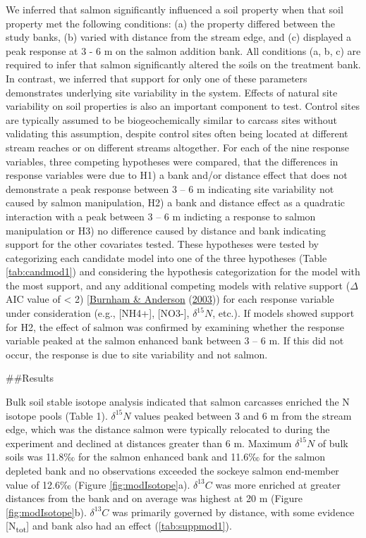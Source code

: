 \documentclass [11pt, proquest] {uwthesis}[2015/03/03]
\begin{document}
We inferred that salmon significantly influenced a soil property when that soil property met the following conditions: (a) the property differed between the study banks, (b) varied with distance from the stream edge, and (c) displayed a peak response at 3 - 6 m on the salmon addition bank. All conditions (a, b, c) are required to infer that salmon significantly altered the soils on the treatment bank. In contrast, we inferred that support for only one of these parameters demonstrates underlying site variability in the system. Effects of natural site variability on soil properties is also an important component to test. Control sites are typically assumed to be biogeochemically similar to carcass sites without validating this assumption, despite control sites often being located at different stream reaches or on different streams altogether. For each of the nine response variables, three competing hypotheses were compared, that the differences in response variables were due to H1) a bank and/or distance effect that does not demonstrate a peak response between 3 -- 6 m indicating site variability not caused by salmon manipulation, H2) a bank and distance effect as a quadratic interaction with a peak between 3 -- 6 m indicting a response to salmon manipulation or H3) no difference caused by distance and bank indicating support for the other covariates tested. These hypotheses were tested by categorizing each candidate model into one of the three hypotheses (Table \ref{tab:candmod1}) and considering the hypothesis categorization for the model with the most support, and any additional competing models with relative support (\(\Delta\)AIC value of \textless{} 2) {[}\protect\hyperlink{ref-Burnham2003}{Burnham \& Anderson} (\protect\hyperlink{ref-Burnham2003}{2003})) for each response variable under consideration (e.g., {[}NH4+{]}, {[}NO3-{]}, \(\delta^{15}N\), etc.). If models showed support for H2, the effect of salmon was confirmed by examining whether the response variable peaked at the salmon enhanced bank between 3 -- 6 m. If this did not occur, the response is due to site variability and not salmon.

\#\#Results

Bulk soil stable isotope analysis indicated that salmon carcasses enriched the N isotope pools (Table 1). \(\delta^{15}N\) values peaked between 3 and 6 m from the stream edge, which was the distance salmon were typically relocated to during the experiment and declined at distances greater than 6 m. Maximum \(\delta^{15}N\) of bulk soils was 11.8‰ for the salmon enhanced bank and 11.6‰ for the salmon depleted bank and no observations exceeded the sockeye salmon end-member value of 12.6‰ (Figure \ref{fig:modIsotope}a). \(\delta^{13}C\) was more enriched at greater distances from the bank and on average was highest at 20 m (Figure \ref{fig:modIsotope}b). \(\delta^{13}C\) was primarily governed by distance, with some evidence {[}N\textsubscript{tot}{]} and bank also had an effect (\ref{tab:suppmod1}).
\end{document}
